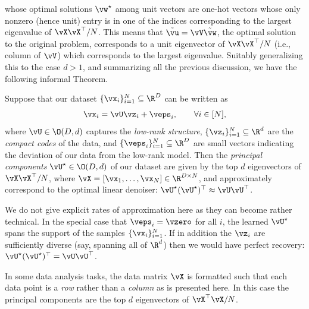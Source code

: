 \documentclass[../../book-main.tex]{subfiles}
\begin{document}
whose optimal solutions \(\vw^{\star}\) among unit vectors are one-hot vectors whose only nonzero (hence unit) entry is in one of the indices corresponding to the largest eigenvalue of \(\vX\vX^{\top}/N\). This means that \(\tilde{\vu} = \vV\tilde{\vw}\), the optimal solution to the original problem, corresponds to a unit eigenvector of \(\vX\vX^{\top}/N\) (i.e., column of \(\vV\)) which corresponds to the largest eigenvalue.  Suitably generalizing this to the case \(d > 1\), and summarizing all the previous discussion, we have the following informal Theorem.
\begin{theorem}\label{thm:pca}
    Suppose that our dataset \(\{\vx_{i}\}_{i = 1}^{N} \subseteq \R^{D}\) can be written as 
    \begin{equation}
        \vx_{i} = \vU\vz_{i} + \veps_{i}, \qquad \forall i \in [N],
    \end{equation}
    where \(\vU \in \O(D, d)\) captures the \textit{low-rank structure},
    \(\{\vz_{i}\}_{i = 1}^{N} \subseteq \R^{d}\) are the \textit{compact codes}
    of the data, and \(\{\veps_{i}\}_{i = 1}^{N} \subseteq \R^{D}\) are small
    vectors indicating the deviation of our data from the low-rank model. Then
    the \textit{principal components} \(\vU^{\star} \in \O(D, d)\) of our
    dataset are given by the top \(d\) eigenvectors of \(\vX\vX^{\top}/N\),
    where \(\vX = [\vx_{1}, \dots, \vx_{N}] \in \R^{D \times N}\), and
    approximately correspond to the optimal linear denoiser:
    \(\vU^{\star}(\vU^{\star})^{\top} \approx \vU\vU^{\top}\).
\end{theorem}
We do not give explicit rates of approximation here as they can become rather
technical. In the special case that \(\veps_{i} = \vzero\) for all \(i\), the
learned \(\vU^{\star}\) spans the support of the samples \(\{\vx_{i}\}_{i
= 1}^{N}\). If in addition the \(\vz_{i}\) are sufficiently diverse (say,
spanning all of \(\R^{d}\)) then we would have perfect recovery:
\(\vU^{\star}(\vU^{\star})^{\top} = \vU\vU^{\top}\).


\begin{remark}
    In some data analysis tasks, the data matrix \(\vX\) is formatted such that each data point is a \textit{row} rather than a \textit{column} as is presented here. In this case the principal components are the top \(d\) eigenvectors of \(\vX^{\top}\vX/N\).
\end{remark}
\end{document}
